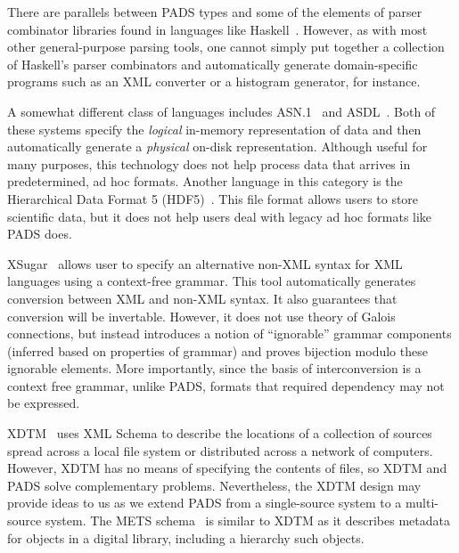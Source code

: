 \documentclass[11pt]{article}
\begin{document}
There are parallels between PADS types and some of the elements of parser
combinator libraries found in languages like
Haskell~\cite{burge:parser-combinators,hutton+:parser-combinators}. 
However, as with most other general-purpose parsing tools, one cannot
simply put together a collection of Haskell's parser combinators and
automatically generate domain-specific programs such as 
an XML converter or a histogram generator, for instance.  

A somewhat different class of languages includes
\textsc{ASN.1}~\cite{asn} and \textsc{ASDL}~\cite{asdl}.  Both of
these systems specify the {\em logical\/} in-memory representation of
data and then automatically generate a {\em physical\/} on-disk
representation.  Although useful for many purposes, this technology
does not help process data that arrives in predetermined, ad hoc
formats.  Another language in this category is the Hierarchical Data
Format 5 (HDF5)~\cite{hdf5}.  This file format allows users to store
scientific data, but it does not help users deal with legacy ad hoc
formats like PADS does.


XSugar~\cite{brabrand+:xsugar2005} allows user to specify an
alternative non-XML syntax for XML languages using a context-free
grammar.  This tool automatically generates conversion between XML and
non-XML syntax. It also guarantees that conversion will be invertable.
However, it does not use theory of Galois connections, but instead
introduces a notion of ``ignorable'' grammar components (inferred
based on properties of grammar) and proves bijection modulo these
ignorable elements.  More importantly, since the basis of
interconversion is a context free grammar, unlike PADS, formats that
required dependency may not be expressed.

XDTM~\cite{zhao+:sigmod05,xdtm} uses XML Schema to describe the
locations of a collection of sources spread across a local file system
or distributed across a network of computers.  However, XDTM has no
means of specifying the contents of files, so XDTM and PADS solve
complementary problems.  Nevertheless, the XDTM design may provide
ideas to us as we extend PADS from a single-source system to a
multi-source system. The METS schema~\cite{mets} is similar to XDTM as
it describes metadata for objects in a digital library, including a
hierarchy such objects.
\end{document}

